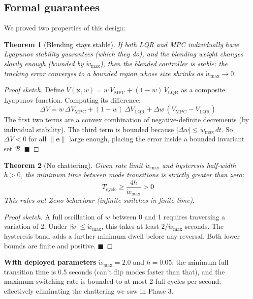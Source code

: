 \documentclass[12pt,a4paper]{article}
\newtheorem{theorem}{Theorem}
\begin{document}
\subsection{Formal guarantees}

We proved two properties of this design:

\begin{theorem}[Blending stays stable]
If both LQR and MPC individually have Lyapunov stability guarantees (which
they do), and the blending weight changes slowly enough (bounded by
$\dot{w}_{\max}$), then the blended controller is stable: the tracking
error converges to a bounded region whose size shrinks as
$\dot{w}_{\max} \to 0$.
\end{theorem}

\begin{proof}[Proof sketch]
Define $V(\mathbf{x}, w) = w\,V_{\text{MPC}} + (1-w)\,V_{\text{LQR}}$
as a composite Lyapunov function. Computing its difference:
\[
  \Delta V = w\,\Delta V_{\text{MPC}} + (1-w)\,\Delta V_{\text{LQR}}
             + \Delta w\,(V_{\text{MPC}} - V_{\text{LQR}})
\]
The first two terms are a convex combination of negative-definite decrements
(by individual stability). The third term is bounded because $|\Delta w|
\leq \dot{w}_{\max}\,dt$. So $\Delta V < 0$ for all $\|\mathbf{e}\|$ large
enough, placing the error inside a bounded invariant set
$\mathcal{B}$. \qquad $\blacksquare$
\end{proof}

\begin{theorem}[No chattering]
Given rate limit $\dot{w}_{\max}$ and hysteresis half-width $h > 0$, the
minimum time between mode transitions is strictly greater than zero:
\[
  T_{\text{cycle}} \geq \frac{4h}{\dot{w}_{\max}} > 0
\]
This rules out Zeno behaviour (infinite switches in finite time).
\end{theorem}

\begin{proof}[Proof sketch]
A full oscillation of $w$ between 0 and 1 requires traversing a variation
of 2. Under $|\dot{w}| \leq \dot{w}_{\max}$, this takes at least
$2/\dot{w}_{\max}$ seconds. The hysteresis band adds a further minimum
dwell before any reversal. Both lower bounds are finite and positive.
$\blacksquare$
\end{proof}

\begin{successbox}
\textbf{With deployed parameters} $\dot{w}_{\max} = 2.0$ and $h = 0.05$:
the minimum full transition time is 0.5 seconds (can't flip modes faster
than that), and the maximum switching rate is bounded to at most 2
full cycles per second: effectively eliminating the chattering we saw
in Phase 3.
\end{successbox}
\end{document}
